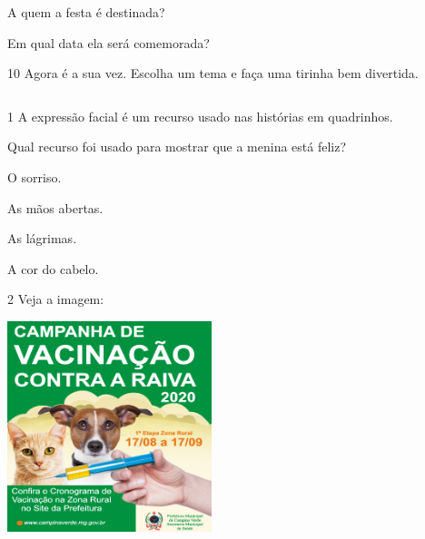 \begin{escolha}
\item A quem a festa é destinada?


\item Em qual data ela será comemorada?

\end{escolha}

\num{10} Agora é a sua vez. Escolha um tema e faça uma tirinha bem divertida.

\begin{longtable}[]{@{}ll@{}}
\toprule
&\tabularnewline
\bottomrule
\end{longtable}


\num{1} A expressão facial é um recurso usado nas histórias em quadrinhos.


Qual recurso foi usado para mostrar que a menina está feliz?

\begin{escolha}
\item O sorriso.

\item As mãos abertas.

\item As lágrimas.

\item A cor do cabelo.
\end{escolha}

\num{2} Veja a imagem:

\includegraphics[width=2.34507in,height=2.41801in]{media/image137.png}

